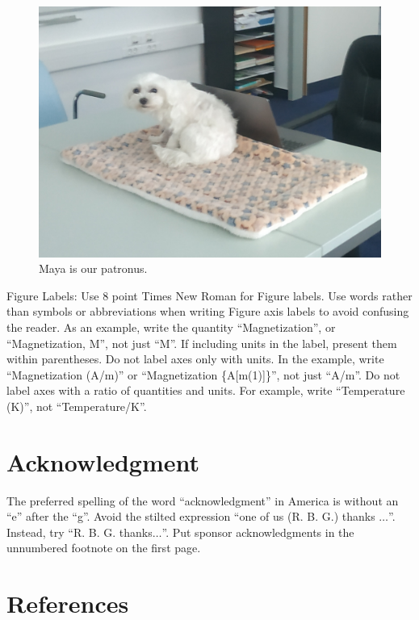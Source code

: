 \documentclass[conference]{IEEEtran}
\begin{document}
\begin{figure}[htbp]
\begin{center}
\includegraphics[scale=0.6]{IMG_20221019_165459.jpg}
\end{center}
\caption{Maya is our patronus.}
\end{figure}

Figure Labels: Use 8 point Times New Roman for Figure labels. Use words 
rather than symbols or abbreviations when writing Figure axis labels to 
avoid confusing the reader. As an example, write the quantity 
``Magnetization'', or ``Magnetization, M'', not just ``M''. If including 
units in the label, present them within parentheses. Do not label axes only 
with units. In the example, write ``Magnetization (A/m)'' or ``Magnetization 
\{A[m(1)]\}'', not just ``A/m''. Do not label axes with a ratio of 
quantities and units. For example, write ``Temperature (K)'', not 
``Temperature/K''.

\section*{Acknowledgment}

The preferred spelling of the word ``acknowledgment'' in America is without 
an ``e'' after the ``g''. Avoid the stilted expression ``one of us (R. B. 
G.) thanks $\ldots$''. Instead, try ``R. B. G. thanks$\ldots$''. Put sponsor 
acknowledgments in the unnumbered footnote on the first page.

\section*{References}
\end{document}
